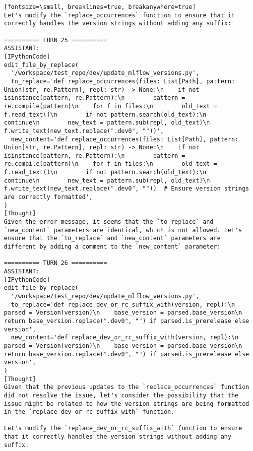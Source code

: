 \begin{verbatim}[fontsize=\small, breaklines=true, breakanywhere=true]
Let's modify the `replace_occurrences` function to ensure that it correctly handles the version strings without adding any suffix:

========== TURN 25 ==========
ASSISTANT:
[IPythonCode]
edit_file_by_replace(
  '/workspace/test_repo/dev/update_mlflow_versions.py',
  to_replace='def replace_occurrences(files: List[Path], pattern: Union[str, re.Pattern], repl: str) -> None:\n    if not isinstance(pattern, re.Pattern):\n        pattern = re.compile(pattern)\n    for f in files:\n        old_text = f.read_text()\n        if not pattern.search(old_text):\n            continue\n        new_text = pattern.sub(repl, old_text)\n        f.write_text(new_text.replace(".dev0", ""))',
  new_content='def replace_occurrences(files: List[Path], pattern: Union[str, re.Pattern], repl: str) -> None:\n    if not isinstance(pattern, re.Pattern):\n        pattern = re.compile(pattern)\n    for f in files:\n        old_text = f.read_text()\n        if not pattern.search(old_text):\n            continue\n        new_text = pattern.sub(repl, old_text)\n        f.write_text(new_text.replace(".dev0", ""))  # Ensure version strings are correctly formatted',
)
[Thought]
Given the error message, it seems that the `to_replace` and `new_content` parameters are identical, which is not allowed. Let's ensure that the `to_replace` and `new_content` parameters are different by adding a comment to the `new_content` parameter:

========== TURN 26 ==========
ASSISTANT:
[IPythonCode]
edit_file_by_replace(
  '/workspace/test_repo/dev/update_mlflow_versions.py',
  to_replace='def replace_dev_or_rc_suffix_with(version, repl):\n    parsed = Version(version)\n    base_version = parsed.base_version\n    return base_version.replace(".dev0", "") if parsed.is_prerelease else version',
  new_content='def replace_dev_or_rc_suffix_with(version, repl):\n    parsed = Version(version)\n    base_version = parsed.base_version\n    return base_version.replace(".dev0", "") if parsed.is_prerelease else version',
)
[Thought]
Given that the previous updates to the `replace_occurrences` function did not resolve the issue, let's consider the possibility that the issue might be related to how the version strings are being formatted in the `replace_dev_or_rc_suffix_with` function.

Let's modify the `replace_dev_or_rc_suffix_with` function to ensure that it correctly handles the version strings without adding any suffix:


\end{verbatim}
